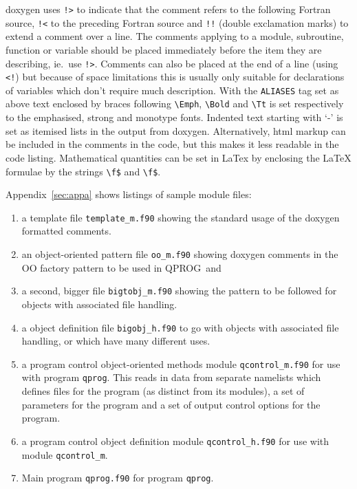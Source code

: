 \documentclass[11pt,twoside,a4paper]{report}
\newcommand{\T}[1]{{\tt #1}}
\def\coden{QPROG} %
\begin{document}
doxygen uses \verb|!>| to indicate that the comment refers to the following
Fortran source, \verb|!<| to the preceding Fortran source and \verb|!!| (double
exclamation marks) to extend a comment over a line.  The comments
applying to a module, subroutine, function or variable should be
placed immediately before the item they are describing, ie.\ use \verb|!>|.
Comments can also be placed at the end of a line (using \verb|<!|) but
because of space limitations
this is usually only suitable for declarations of variables which
don't require much description.  With the \T{ALIASES} tag set as above
text enclosed by braces following \verb|\Emph|, \verb|\Bold|  and \verb|\Tt|  is set
respectively to the emphasised, strong and monotype fonts.
Indented text starting with `-' is set as itemised lists in the
output from doxygen.  Alternatively, html markup can be included
in the comments in the code, but this makes it less readable in the
code listing. Mathematical quantities can be set in LaTex by enclosing the LaTeX
formulae by the strings \verb|\f$| and \verb|\f$|.

Appendix~\ref{sec:appa} shows listings of sample module files: 
\begin{enumerate}
\item a template file \texttt{template\_m.f90} showing the standard
  usage of the doxygen formatted comments.
\item an object-oriented pattern file \texttt{oo\_m.f90} showing doxygen
  comments in the OO factory pattern to be used in \coden\ and
\item a second, bigger  file \texttt{bigtobj\_m.f90} showing the pattern
  to be followed for objects with associated file handling.
\item a object definition file \texttt{bigobj\_h.f90} to go with
  objects with associated file handling, or which have many different uses.
\item a program control object-oriented methods module
  \texttt{qcontrol\_m.f90} for use with program \texttt{qprog}. This reads
  in data from separate namelists which defines files for the program (as
  distinct from its modules), a set of parameters for the program and a
  set of output control options for the program.
\item a program control object definition module
  \texttt{qcontrol\_h.f90} for use with module \texttt{qcontrol\_m}.
\item Main program \texttt{qprog.f90} for program \texttt{qprog}.

\end{enumerate}
\end{document}
